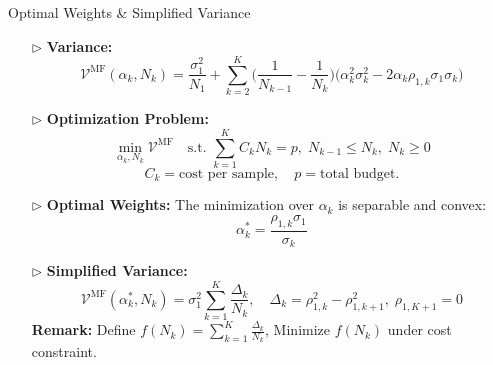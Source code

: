 \documentclass{beamer}
\begin{document}
\begin{frame}{Optimal Weights \& Simplified Variance }
\begin{itemize}[leftmargin=5pt] 

\item[$\triangleright$] \textcolor{myblue3}{\bf Variance:}
    {\footnotesize
    \[
    \mathcal{V}^{\text{MF}}(\alpha_k, N_k)
    =\frac{\sigma_1^2}{N_1} 
    + \sum_{k=2}^K \!\Big(\frac{1}{N_{k-1}} - \frac{1}{N_k}\Big)\!
    \big(\alpha_k^2\sigma_k^2 - 2\alpha_k\rho_{1,k}\sigma_1\sigma_k\big)
    \]
    }

\item[$\triangleright$] \textcolor{myblue3}{\bf Optimization Problem:}
    {\footnotesize
    \[
    \min_{\alpha_k,N_k}\mathcal{V}^{\text{MF}} \quad
    \text{s.t. } \sum_{k=1}^K C_k N_k = p, \;
    N_{k-1}\le N_k, \; N_k\ge 0
    \]
    \[
    C_k = \text{cost per sample}, \quad p = \text{total budget.}
    \]
    }
    
\item[$\triangleright$] \textcolor{myblue3}{\bf Optimal Weights:} 
{\footnotesize
The minimization over $\alpha_k$ is separable and convex:
    \[
    \alpha_k^* = \frac{\rho_{1,k}\sigma_1}{\sigma_k}
    \]
    }
    
\item[$\triangleright$] \textcolor{myblue3}{\bf Simplified Variance:}
{\footnotesize
    \[
    \mathcal{V}^{\text{MF}}(\alpha_k^*,N_k)
    = \sigma_1^2\sum_{k=1}^K \frac{\Delta_k}{N_k},
    \quad
    \Delta_k = \rho_{1,k}^2 - \rho_{1,k+1}^2,\;\rho_{1,K+1}=0
    \]
    \textcolor{myred}{\bf \normalsize Remark:} Define $\displaystyle f(N_k)=\sum_{k=1}^K\frac{\Delta_k}{N_k}$, Minimize $f(N_k)$ under cost constraint.
    }
\end{itemize}
\end{frame}
\end{document}
